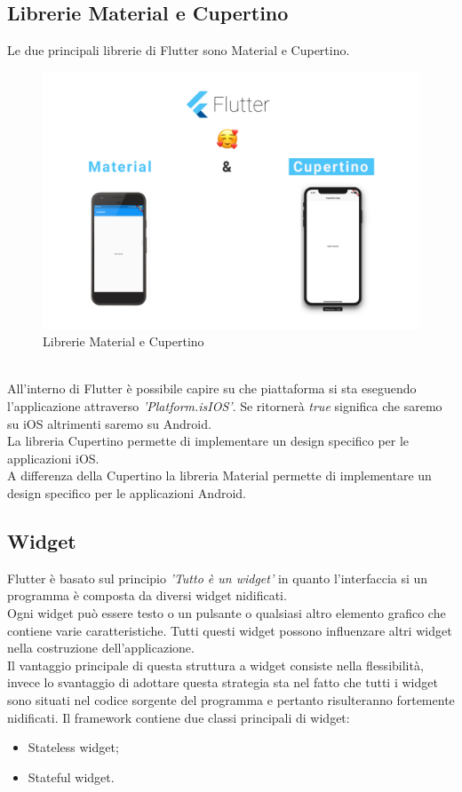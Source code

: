\subsection{Librerie Material e Cupertino}
Le due principali librerie di Flutter sono Material e Cupertino.\\
\begin{figure}[htbp]	
	\centering
	\includegraphics[width=14cm]{immagini/librerieCM.png}
	\caption{Librerie Material e Cupertino}
	\label{fig:Librerie Material e Cupertino}
\end{figure}
\\
All'interno di Flutter è possibile capire su che piattaforma si sta eseguendo l'applicazione attraverso \textit{'Platform.isIOS'}. Se ritornerà \textit{true} significa che saremo su iOS altrimenti saremo su Android.\\
La libreria Cupertino permette di implementare un design specifico per le applicazioni iOS.\\
A differenza della Cupertino la libreria Material permette di implementare un design specifico per le applicazioni Android.

\subsection{Widget}
\label{sec:Widget}
Flutter è basato sul principio \textit{'Tutto è un widget'} in quanto l'interfaccia si un programma è composta da diversi widget nidificati.\\
Ogni widget può essere testo o un pulsante o qualsiasi altro elemento grafico che contiene varie caratteristiche. Tutti questi widget possono influenzare altri widget nella costruzione dell'applicazione.\\
Il vantaggio principale di questa struttura a widget consiste nella flessibilità, invece lo svantaggio di adottare questa strategia sta nel fatto che tutti i widget sono situati nel codice sorgente del programma e pertanto risulteranno fortemente nidificati.
\newpage
Il framework contiene due classi principali di widget:
\begin{itemize}
	\item Stateless widget;   
	\item Stateful widget.
\end{itemize}

